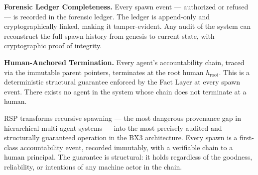 \bigskip
\noindent\textbf{Forensic Ledger Completeness.} Every spawn event — authorized or refused — is recorded in the forensic ledger. The ledger is append-only and cryptographically linked, making it tamper-evident. Any audit of the system can reconstruct the full spawn history from genesis to current state, with cryptographic proof of integrity.

\bigskip
\noindent\textbf{Human-Anchored Termination.} Every agent's accountability chain, traced via the immutable parent pointers, terminates at the root human $h_{\text{root}}$. This is a deterministic structural guarantee enforced by the Fact Layer at every spawn event. There exists no agent in the system whose chain does not terminate at a human.

\bigskip
RSP transforms recursive spawning — the most dangerous provenance gap in hierarchical multi-agent systems — into the most precisely audited and structurally guaranteed operation in the BX3 architecture. Every spawn is a first-class accountability event, recorded immutably, with a verifiable chain to a human principal. The guarantee is structural: it holds regardless of the goodness, reliability, or intentions of any machine actor in the chain.
